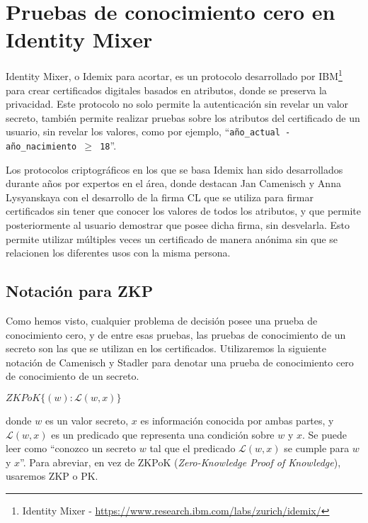 %
%
%
%
%





\section{Pruebas de conocimiento cero en Identity Mixer}

Identity Mixer, o Idemix para acortar, es un protocolo desarrollado por IBM\footnote{Identity Mixer - \url{https://www.research.ibm.com/labs/zurich/idemix/}} para crear certificados digitales basados en atributos, donde se preserva la privacidad. Este protocolo no solo permite la autenticación sin revelar un valor secreto, también permite realizar pruebas sobre los atributos del certificado de un usuario, sin revelar los valores, como por ejemplo, ``\texttt{año\_actual - año\_nacimiento $\geq$ 18}''.

Los protocolos criptográficos en los que se basa Idemix \citep{idemixSpec} han sido desarrollados durante años por expertos en el área, donde destacan Jan Camenisch y Anna Lysyanskaya con el desarrollo de la firma CL \citep{camenisch2002signature} \citep{camenisch2001efficient} que se utiliza para firmar certificados sin tener que conocer los valores de todos los atributos, y que permite posteriormente al usuario demostrar que posee dicha firma, sin desvelarla. Esto permite utilizar múltiples veces un certificado de manera anónima sin que se relacionen los diferentes usos con la misma persona.





\subsection{Notación para ZKP}

Como hemos visto, cualquier problema de decisión posee una prueba de conocimiento cero, y de entre esas pruebas, las pruebas de conocimiento de un secreto son las que se utilizan en los certificados. Utilizaremos la siguiente notación de Camenisch y Stadler \citep{camenisch1997efficient} para denotar una prueba de conocimiento cero de conocimiento de un secreto.

\begin{center}
	$ZKPoK\{ (w) : \mathcal{L}(w,x) \}$
\end{center}
donde $w$ es un valor secreto, $x$ es información conocida por ambas partes, y $\mathcal{L}(w,x)$ es un predicado que representa una condición sobre $w$ y $x$. Se puede leer como ``conozco un secreto $w$ tal que el predicado $\mathcal{L}(w,x)$ se cumple para $w$ y $x$''. Para abreviar, en vez de ZKPoK (\textit{Zero-Knowledge Proof of Knowledge}), usaremos ZKP o PK.

